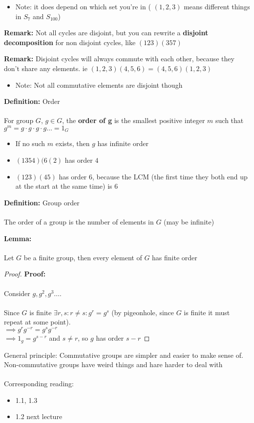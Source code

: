\documentclass{article}
\begin{document}
\begin{example}
\begin{itemize}
	\item Note: it does depend on which set you're in ( $(1,2,3)$ means different things in $S_7$ and $S_{100}$)
\end{itemize}
\begin{remark} 
\textbf{Remark:}  Not all cycles are disjoint, but you can rewrite a {\color{blue} \textbf{disjoint decomposition}} for non disjoint cycles, like $(123)(357)$
\end{remark}
\begin{remark} 
	\textbf{Remark:} Disjoint cycles will always commute with each other, because they don't share any elements. ie $(1,2,3)(4,5,6) = (4,5,6)(1,2,3)$ 
	\begin{itemize}
		\item Note: Not all commutative elements are disjoint though
	\end{itemize}
\end{remark}
\end{example}
\begin{definition} 
\textbf{Definition:} Order \\
~\\
For group $G$, $g\in G$, the {\color{blue} \textbf{order of g}} is the smallest positive integer $m$ such that $g^m = g\cdot g\cdot g\cdot g \ldots = 1_G$
\begin{itemize}
	\item If no such $m$ exists, then $g$ has infinite order
	\item $(1354)(6(2)$ has order $4$
	\item $(123)(45)$ has order $6$, because the LCM (the first time they both end up at the start at the same time) is $6$
\end{itemize}
\end{definition}
\begin{definition} 
\textbf{Definition:} Group order \\
~\\
The order of a group is the number of elements in $G$ (may be infinite)
\end{definition}
\begin{lemma} 
\textbf{Lemma:} \\
~\\
Let $G$ be a finite group, then every element of $G$ has finite order
\end{lemma}
\begin{proof} 
\textbf{Proof:} \\
~\\
Consider $g,g^2,g^3\ldots$. \\
~\\
Since $G$ is finite $\exists r,s: r\neq s: g^r = g^s$ (by pigeonhole, since $G$ is finite it must repeat at some point). \\
$\implies g^r g^{-r} = g^s g^{-r}$ \\
$\implies 1_g = g^{s-r}$ and $s\neq r$, so $g$ has order $s-r$
\end{proof}
General principle: Commutative groups are simpler and easier to make sense of. Non-commutative groups have weird things and hare harder to deal with \\
~\\
Corresponding reading:
\begin{itemize}
	\item 1.1, 1.3
	\item 1.2 next lecture
\end{itemize}
\end{document}
